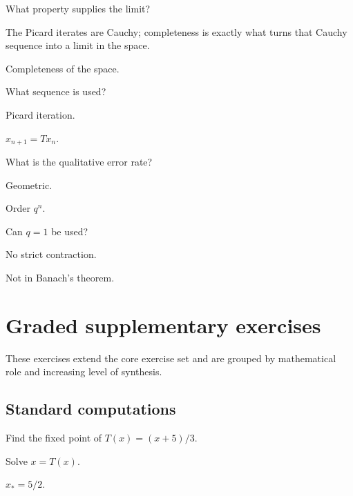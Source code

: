 \begin{exercise}\label{exr:ii16-05}
What property supplies the limit?
\end{exercise}
\begin{hint}
The Picard iterates are Cauchy; completeness is exactly what turns that Cauchy sequence into a limit in the space.
\end{hint}
\begin{solution}
Completeness of the space.
\end{solution}

\begin{exercise}\label{exr:ii16-06}
What sequence is used?
\end{exercise}
\begin{hint}
Picard iteration.
\end{hint}
\begin{solution}
$x_{n+1}=Tx_n$.
\end{solution}

\begin{exercise}\label{exr:ii16-07}
What is the qualitative error rate?
\end{exercise}
\begin{hint}
Geometric.
\end{hint}
\begin{solution}
Order $q^n$.
\end{solution}

\begin{exercise}\label{exr:ii16-08}
Can $q=1$ be used?
\end{exercise}
\begin{hint}
No strict contraction.
\end{hint}
\begin{solution}
Not in Banach's theorem.
\end{solution}


\section{Graded supplementary exercises}
These exercises extend the core exercise set and are grouped by mathematical role and increasing level of synthesis.

\subsection*{Standard computations}

\begin{exercise}\label{exr:ii16-expand-01}
Find the fixed point of \(T(x)=(x+5)/3\).
\end{exercise}
\begin{hint}
Solve \(x=T(x)\).
\end{hint}
\begin{solution}
\(x_*=5/2\).
\end{solution}

